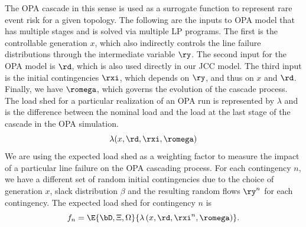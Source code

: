 The OPA cascade in this sense is used as a surrogate function to represent rare event risk for a given topology.  The following are the inputs to OPA model that has multiple stages and is solved via multiple LP programs.  The first is the controllable generation $x$, which also indirectly controls the line failure distributions through the intermediate variable $\ry$.  The second input for the OPA model is $\rd$, which is also used directly in our JCC model.  The third input is the initial contingencies $\rxi$, which depends on $\ry$, and thus on $x$ and $\rd$.  Finally, we have $\romega$, which governs the evolution of the cascade process. The load shed for a particular realization of an OPA run is represented by $\lambda$ and is the difference between the nominal load and the load at the last stage of the cascade in the OPA simulation.
\begin{equation}
\lambda ( x, \rd, \rxi, \romega )
\end{equation}
We are using the expected load shed as a weighting factor to measure the impact of a particular line failure on the OPA cascading process.  For each contingency $n$, we have a different set of random initial contingencies due to the choice of generation $x$, slack distribution $\beta$ and the resulting random flows $\ry^n$ for each contingency.  The expected load shed for contingency $n$ is
\begin{equation*}
f_n = \E{\bD, \Xi,\Omega}{ \lambda\left(x,\rd,\rxi^n,\romega\right) }.
\end{equation*}



